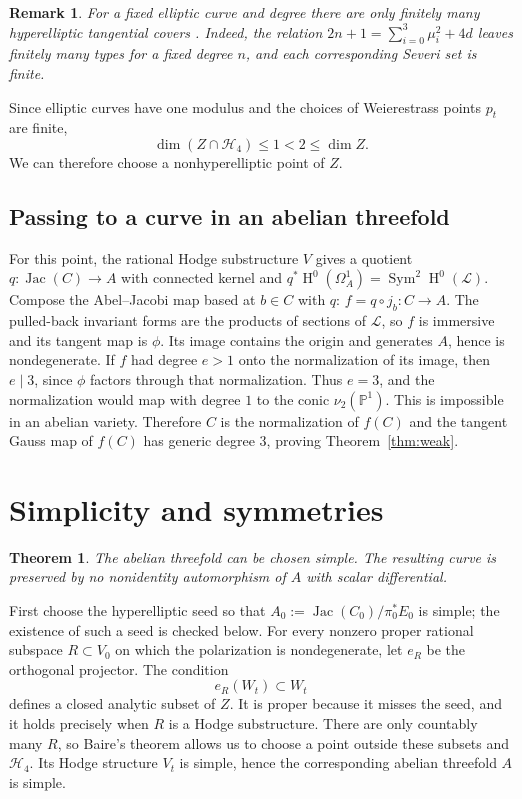 \documentclass{amsart}
\newtheorem{theorem}{Theorem}
\newtheorem{remark}{Remark}[section]
\DeclareMathOperator{\Sym}{Sym}
\DeclareMathOperator{\Hnm}{H}
\DeclareMathOperator{\Jac}{Jac}
\begin{document}
\begin{remark}
For a fixed elliptic curve and degree there are only finitely many
hyperelliptic tangential covers
\cite[Proposition~2.5, 3.; Section~2, Remark~1, 3.--4.]{treibich2025}.
Indeed, the relation $2n+1=\sum_{i=0}^3\mu_i^2+4d$ leaves finitely many
types for a fixed degree $n$, and each corresponding Severi set is
finite. 
\end{remark}

Since elliptic curves have one modulus and the choices of Weierestrass points
$p_t$ are finite,
\[
\dim\left(Z\cap\mathcal{H}_4\right)\leqslant1<2\leqslant\dim Z.
\]
We can therefore choose a nonhyperelliptic point of $Z$.

\subsection{Passing to a curve in an abelian threefold}\label{subsec:image}

For this point, the rational Hodge substructure $V$ gives a quotient
$q:\Jac(C)\longrightarrow A$ with connected kernel and
$q^*\Hnm^0(\Omega_A^1)=\Sym^2\Hnm^0(\mathcal{L})$.
Compose the Abel--Jacobi map based at $b\in C$ with $q$:
$f=q\circ j_b:C\longrightarrow A$. The pulled-back invariant forms
are the products of sections of $\mathcal{L}$, so $f$ is immersive and
its tangent map is $\phi$. Its image contains the origin and generates
$A$, hence is nondegenerate. If $f$ had degree $e>1$ onto the
normalization of its image, then $e\mid3$, since $\phi$ factors through
that normalization. Thus $e=3$, and the normalization would map with
degree $1$ to the conic $\nu_2(\mathbb{P}^1)$. This is impossible in an
abelian variety. Therefore $C$ is the normalization of $f(C)$ and the
tangent Gauss map of $f(C)$ has generic degree $3$, proving
Theorem~\ref{thm:weak}.

\section{Simplicity and symmetries}

\begin{theorem}\label{thm:strong}
The abelian threefold can be chosen simple. The resulting curve is
preserved by no nonidentity automorphism of $A$ with scalar differential.
\end{theorem}

First choose the hyperelliptic seed so that
$A_0:=\Jac(C_0)/\pi_0^*E_0$ is simple; the existence of such a seed is
checked below. For every nonzero proper rational
subspace $R\subset V_0$ on which the polarization is nondegenerate, let
$e_R$ be the orthogonal projector. The condition
\[
e_R(W_t)\subset W_t
\]
defines a closed analytic subset of $Z$. It is proper because it misses
the seed, and it holds precisely when $R$ is a Hodge substructure.
There are only countably many $R$, so Baire's theorem allows us to choose
a point outside these subsets and $\mathcal{H}_4$. Its Hodge structure
$V_t$ is simple, hence the corresponding abelian threefold $A$ is simple.
\end{document}
